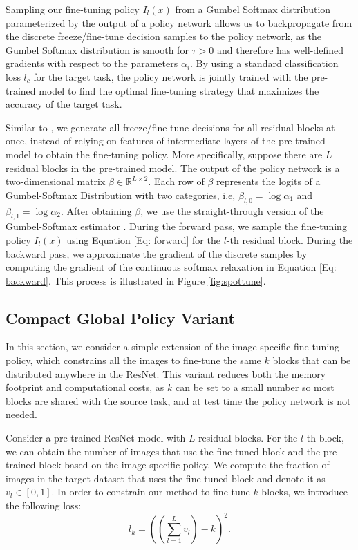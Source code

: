 \documentclass[10pt,twocolumn,letterpaper]{article}
\begin{document}
 Sampling our fine-tuning policy $I_l(x)$ from a Gumbel Softmax distribution parameterized by the output of a policy network allows us to backpropagate from the discrete freeze/fine-tune decision samples to the policy network, as the Gumbel Softmax distribution is smooth for $\tau > 0$ and therefore has well-defined gradients with respect to the parameters $\alpha_i$. By using a standard classification loss $l_c$ for the target task, the policy network is jointly trained with the pre-trained model to find the optimal fine-tuning strategy that maximizes the accuracy of the target task.
 
 Similar to \cite{wu2018blockdrop}, we generate all freeze/fine-tune decisions for all residual blocks at once, instead of relying on features of intermediate layers of the pre-trained model to obtain the fine-tuning policy. More specifically, suppose there are $L$ residual blocks in the pre-trained model. The output of the policy network is a two-dimensional matrix $\beta \in \mathbb{R}^{L \times 2}$. Each row of $\beta$ represents the logits of a Gumbel-Softmax Distribution with two categories, i.e, $\beta_{l,0} = \log \alpha_1$ and $\beta_{l,1} = \log \alpha_2$. After obtaining $\beta$, we use the straight-through version of the Gumbel-Softmax estimator \cite{jang2016categorical}. During the forward pass, we sample the fine-tuning policy $I_l(x)$ using Equation \ref{Eq: forward} for the $l$-th residual block. During the backward pass, we approximate the gradient of the discrete samples by computing the gradient of the continuous softmax relaxation in Equation \ref{Eq: backward}. This process is illustrated in Figure \ref{fig:spottune}.
 
\subsection{Compact Global Policy Variant}\label{sec:global}
In this section, we consider a simple extension of the image-specific fine-tuning policy, which constrains all the images to fine-tune the same $k$ blocks that can be distributed anywhere in the ResNet. This variant reduces both the memory footprint and computational costs, as $k$ can be set to a small number so most blocks are shared with the source task, and at test time the policy network is not needed.

Consider a pre-trained ResNet model with $L$ residual blocks. For the $l$-th block, we can obtain the number of images that use the fine-tuned block and the pre-trained block based on the image-specific policy. We compute the fraction of images in the target dataset that uses the fine-tuned block and denote it as $v_l \in [0, 1]$. In order to constrain our method to fine-tune $k$ blocks, we introduce the following loss:
\begin{equation}
    l_{k} = ((\sum_{l=1}^Lv_l) - k)^2.
\end{equation}
\end{document}
